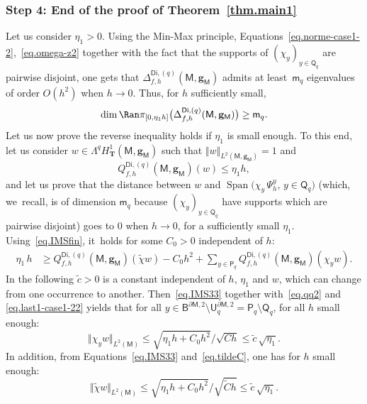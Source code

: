 \documentclass[JEP,XML,SOM,Unicode,NoEqCountersInSection,NoFloatCountersInSection,published]{cedram}
\DeclareMathOperator{\Span}{Span}
\newcommand{\mbf}[1]{\mathbf{#1}}
\let\pa\partial
\theoremstyle{plain}
\theoremstyle{definition}
\begin{document}
\subsubsection*{Step 4: End of the proof of Theorem~\ref{thm.main1}}
Let us consider $\eta_1>0$.
Using the Min-Max principle,
Equations~\eqref{eq.norme-case1-2},~\eqref{eq.omega-z2} together with
the fact that the supports of $(\chi_y)_{y\in \mathsf Q_q}$ are
pairwise disjoint, one gets that $\Delta_{f,h}^{\mathsf{Di},(q)}(\mathsf M,\mbf g_{\mathsf M})$ admits at least~$\mathsf m_q$
eigenvalues of order $O(h^{2})$ when $h\to 0$. Thus, for $h$
sufficiently small,
\[
\dim \Ran \pi_{[0,\eta_1h]}\bigl(\Delta_{f,h}^{\mathsf{Di},(q)}(\mathsf M,\mbf g_{\mathsf M})\bigr)\ge \mathsf m_q.
\]
Let us now prove the reverse inequality holds if $\eta_1$ is small enough. To this end, let us consider $w\in \Lambda^qH^1_{\mbf T}(\mathsf M,\mbf g_{\mathsf M})$ such that $\Vert w\Vert_{L^2(\mathsf M,\mbf g_{\mathsf M})}=1$ and
\[
Q_{f,h}^{\mathsf{Di},(q)}(\mathsf M,\mbf g_{\mathsf M})(w)\le \eta_1 h,
\]
and let us prove that the distance between $w$ and $\Span \bigl(\chi_y\,\Psi_h^y, \, y\in \mathsf Q_q \bigr) $ (which, we~recall, is of dimension $\mathsf m_q$ because $(\chi_y)_{y\in \mathsf Q_q}$ have supports which are pairwise disjoint)
goes to $0$ when $h\to 0$, for a sufficiently small $\eta_1$.
Using~\eqref{eq.IMSfin}, it~holds for some $C_0>0$ independent of $h$:
\begin{align}\label{eq.IMS33}
\eta_1\, h &\ge Q_{f,h}^{\mathsf{Di},(q)}(\mathsf M,\mbf g_{\mathsf M})(\tilde \chi w) -C_0 h^2 +\sum_{y\in \mathsf P_q} Q_{f,h}^{\mathsf{Di},(q)}(\mathsf M,\mbf g_{\mathsf M})(\chi_y w).
\end{align}
In the following $\tilde c>0$ is a constant independent of $h$, $\eta_1$ and $w$, which can change from one occurrence to another.
Then~\eqref{eq.IMS33} together with~\eqref{eq.qq2} and
\eqref{eq.last1-case1-22} yields that for all $y\in \mathsf B^{\pa
\mathsf M,2} \setminus \mathsf U_q^{\pa \mathsf M,2}= \mathsf
P_q\setminus \mathsf Q_q$, for all $h$ small enough:
\begin{equation}\label{eq.est-norm1}
\Vert \chi_y w\Vert_{L^2(\mathsf M)}\le \sqrt {\eta_1h +C_0h^2 }/{\sqrt{C h }} \le \tilde c \, {\sqrt{\eta_1}}.
\end{equation}
In addition, from Equations~\eqref{eq.IMS33} and~\eqref{eq.tildeC}, one has for $h$ small enough:
\begin{equation}\label{eq.est-norm2}
\Vert\tilde \chi w \Vert_{L^2(\mathsf M)}\le \sqrt {\eta_1h +C_0h^2 }/{\sqrt{\tilde C h }}\le \tilde c \, {\sqrt{\eta_1}}.
\end{equation}
\end{document}
